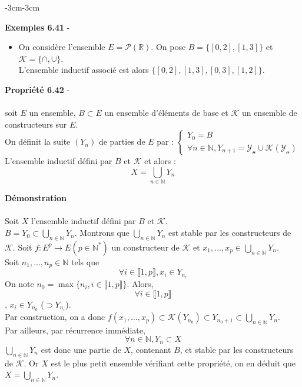 \documentclass{article}
\newenvironment{exemples}[2]
{
    \begin{boite_exemples}
    \textbf{\textcolor{bleu_fonce}{Exemples #1}} - \textit{#2} \\
    \begin{itemize}[label=$\blacktriangleright \quad $]                    
}
{   
    \end{itemize}
    \end{boite_exemples}
    \vspace{15pt}
}
\newenvironment{proposition}[2]
{
    \begin{boite_proposition}
    \textbf{\textcolor{rouge_fonce}{Propriété #1}} - \textit{#2} \\ \\
}
{
    \end{boite_proposition}
    \vspace{15pt}
}
\newenvironment{demonstration}
{
    \begin{boite_demonstration}
    \textbf{\textcolor{rouge_fonce}{Démonstration}}\\ \\
}
{
    \end{boite_demonstration}
    \vspace{15pt}
}
\begin{document}
\begin{adjustwidth}{-3cm}{-3cm}
        \begin{exemples}{6.41}{}
            \item On considère l'ensemble $E = \mathcal{P}(\mathbb{R})$. On pose $B = \{[0,2],[1,3]\}$ et $\mathcal{K} = \{\cap, \cup \}$. \\ L'ensemble inductif associé est alors $\{[0,2], [1,3], [0,3], [1,2]\}$.
        \end{exemples}

        \begin{proposition}{6.42}{}
            soit $E$ un ensemble, $B \subset E$ un ensemble d'éléments de base et $\mathcal{K}$ un ensemble de constructeurs sur $E$. \\ On définit la suite $(Y_n)$ de parties de $E$ par : $\begin{cases}
                Y_0 = B \\
                \forall n \in \mathbb{N}, Y_{n+1} = \mathcal{Y_n \cup \mathcal{K}(Y_n)}
            \end{cases}$
            L'ensemble inductif défini par $B$ et $\mathcal{K}$ et alors : $$X = \bigcup_{n \in \mathbb{N}}Y_n$$
        \end{proposition}

        \begin{demonstration}
            Soit $X$ l'ensemble inductif défini par $B$ et $\mathcal{K}$. \\ $B = Y_0 \subset \bigcup_{n \in \mathbb{N}}Y_n$. Montrons que $\bigcup_{n \in \mathbb{N}}Y_n$ est stable par les constructeurs de $\mathcal{K}$. Soit $f:E^p \rightarrow E (p \in \mathbb{N}^*)$ un constructeur de $\mathcal{K}$ et $x_1, \ldots, x_p \in \bigcup_{n \in \mathbb{N}}Y_n$. \\ Soit $n_1, \ldots, n_p \in \mathbb{N}$ tels que $$\forall i \in \llbracket 1,p \rrbracket, x_i \in Y_{n_i} $$ On note $n_0 = \max\{n_i, i \in \llbracket 1,p \rrbracket\}$. Alors, $$\forall i \in \llbracket 1,p \rrbracket$$, $x_i \in Y_{n_0}$ ($\supset Y_{n_i}$). \\ Par construction, on a donc $f(x_1,\ldots,x_p) \subset \mathcal{K}(Y_{n_0}) \subset Y_{n_0 + 1} \subset \bigcup_{n \in \mathbb{N}}Y_n$.\\ Par ailleurs, par récurrence immédiate, $$\forall n \in \mathbb{N}, Y_n \subset X$$ $\bigcup_{n \in \mathbb{N}}Y_n$ est donc une partie de $X$, contenant $B$, et stable par les constructeurs de $\mathcal{K}$. Or $X$ est le plus petit ensemble vérifiant cette propriété, on en déduit que $X = \bigcup_{n \in \mathbb{N}}Y_n$.
        \end{demonstration}


\end{adjustwidth}
\end{document}
